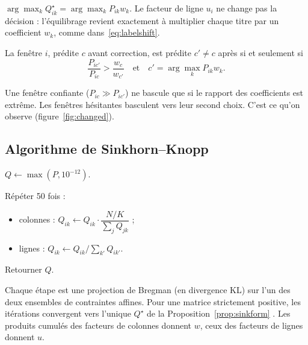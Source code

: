 \begin{corollaire}
$\arg\max_kQ^\star_{ik}=\arg\max_kP_{ik}w_k$. Le facteur de ligne $u_i$ ne change pas la décision : l'équilibrage revient exactement à multiplier chaque titre par un coefficient $w_k$, comme dans~\eqref{eq:labelshift}.
\end{corollaire}

\begin{proposition}
La fenêtre $i$, prédite $c$ avant correction, est prédite $c'\neq c$ après si et seulement si
\begin{equation}
\frac{P_{ic'}}{P_{ic}}>\frac{w_c}{w_{c'}}\quad\text{et}\quad c'=\arg\max_kP_{ik}w_k .
\end{equation}
\end{proposition}
\noindent Une fenêtre confiante ($P_{ic}\gg P_{ic'}$) ne bascule que si le rapport des coefficients est extrême. Les fenêtres hésitantes basculent vers leur second choix. C'est ce qu'on observe (figure~\ref{fig:changed}).

\subsection{Algorithme de Sinkhorn--Knopp}
\begin{algo}[H]
\caption{}
\begin{algobox}
\item $Q\leftarrow\max(P,10^{-12})$.
\item Répéter 50 fois :
\begin{itemize}
\item[] colonnes : $Q_{ik}\leftarrow Q_{ik}\cdot\dfrac{N/K}{\sum_jQ_{jk}}$ ;
\item[] lignes : $Q_{ik}\leftarrow Q_{ik}\Big/\sum_{k'}Q_{ik'}$.
\end{itemize}
\item Retourner $Q$.
\end{algobox}
\end{algo}
Chaque étape est une projection de Bregman (en divergence KL) sur l'un des deux ensembles de contraintes affines. Pour une matrice strictement positive, les itérations convergent vers l'unique $Q^\star$ de la Proposition~\ref{prop:sinkform} \cite{sinkhorn,cuturi}. Les produits cumulés des facteurs de colonnes donnent $w$, ceux des facteurs de lignes donnent $u$.


